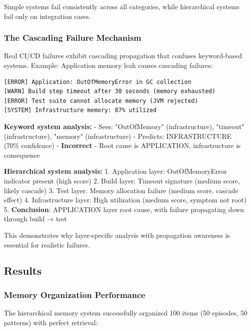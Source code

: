 \documentclass[11pt]{article}
\begin{document}
Simple systems fail consistently across all categories, while hierarchical systems fail only on integration cases.

\subsubsection{The Cascading Failure Mechanism}

Real CI/CD failures exhibit cascading propagation that confuses keyword-based systems. Example: Application memory leak causes cascading failures:

\begin{verbatim}
[ERROR] Application: OutOfMemoryError in GC collection
[WARN] Build step timeout after 30 seconds (memory exhausted)
[ERROR] Test suite cannot allocate memory (JVM rejected)
[SYSTEM] Infrastructure memory: 87% utilized
\end{verbatim}

\textbf{Keyword system analysis:}
- Sees: "OutOfMemory" (infrastructure), "timeout" (infrastructure), "memory" (infrastructure)
- Predicts: INFRASTRUCTURE (70\% confidence)
- \textbf{Incorrect} - Root cause is APPLICATION, infrastructure is consequence

\textbf{Hierarchical system analysis:}
1. Application layer: OutOfMemoryError indicator present (high score)
2. Build layer: Timeout signature (medium score, likely cascade)
3. Test layer: Memory allocation failure (medium score, cascade effect)
4. Infrastructure layer: High utilization (medium score, symptom not root)
5. \textbf{Conclusion}: APPLICATION layer root cause, with failure propagating down through build → test

This demonstrates why layer-specific analysis with propagation awareness is essential for realistic failures.

\subsection{Results}

\subsubsection{Memory Organization Performance}

The hierarchical memory system successfully organized 100 items (50 episodes, 50 patterns) with perfect retrieval:
\end{document}
